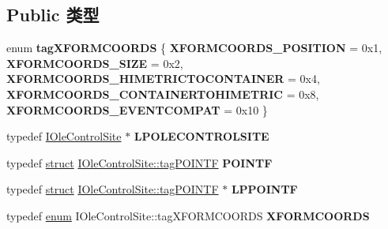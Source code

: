 \subsection*{Public 类型}
\begin{DoxyCompactItemize}
\item 
\mbox{\label{interface_i_ole_control_site_a3707ab55eb89f90c186eccb4f4af28a7}} 
enum {\bfseries tag\+X\+F\+O\+R\+M\+C\+O\+O\+R\+DS} \{ \newline
{\bfseries X\+F\+O\+R\+M\+C\+O\+O\+R\+D\+S\+\_\+\+P\+O\+S\+I\+T\+I\+ON} = 0x1, 
{\bfseries X\+F\+O\+R\+M\+C\+O\+O\+R\+D\+S\+\_\+\+S\+I\+ZE} = 0x2, 
{\bfseries X\+F\+O\+R\+M\+C\+O\+O\+R\+D\+S\+\_\+\+H\+I\+M\+E\+T\+R\+I\+C\+T\+O\+C\+O\+N\+T\+A\+I\+N\+ER} = 0x4, 
{\bfseries X\+F\+O\+R\+M\+C\+O\+O\+R\+D\+S\+\_\+\+C\+O\+N\+T\+A\+I\+N\+E\+R\+T\+O\+H\+I\+M\+E\+T\+R\+IC} = 0x8, 
\newline
{\bfseries X\+F\+O\+R\+M\+C\+O\+O\+R\+D\+S\+\_\+\+E\+V\+E\+N\+T\+C\+O\+M\+P\+AT} = 0x10
 \}
\item 
\mbox{\label{interface_i_ole_control_site_abeb22e448f159a9394457f9b128c6fcd}} 
typedef \hyperlink{interface_i_ole_control_site}{I\+Ole\+Control\+Site} $\ast$ {\bfseries L\+P\+O\+L\+E\+C\+O\+N\+T\+R\+O\+L\+S\+I\+TE}
\item 
\mbox{\label{interface_i_ole_control_site_ab711e41c1815710260ab06d336bd291b}} 
typedef \hyperlink{interfacestruct}{struct} \hyperlink{struct_i_ole_control_site_1_1tag_p_o_i_n_t_f}{I\+Ole\+Control\+Site\+::tag\+P\+O\+I\+N\+TF} {\bfseries P\+O\+I\+N\+TF}
\item 
\mbox{\label{interface_i_ole_control_site_a68645ed604958c52fb16c7249a1edc5a}} 
typedef \hyperlink{interfacestruct}{struct} \hyperlink{struct_i_ole_control_site_1_1tag_p_o_i_n_t_f}{I\+Ole\+Control\+Site\+::tag\+P\+O\+I\+N\+TF} $\ast$ {\bfseries L\+P\+P\+O\+I\+N\+TF}
\item 
\mbox{\label{interface_i_ole_control_site_a1261a49fa1ad10a2aec8f93e20276bf1}} 
typedef \hyperlink{interfaceenum}{enum} I\+Ole\+Control\+Site\+::tag\+X\+F\+O\+R\+M\+C\+O\+O\+R\+DS {\bfseries X\+F\+O\+R\+M\+C\+O\+O\+R\+DS}
\end{DoxyCompactItemize}
